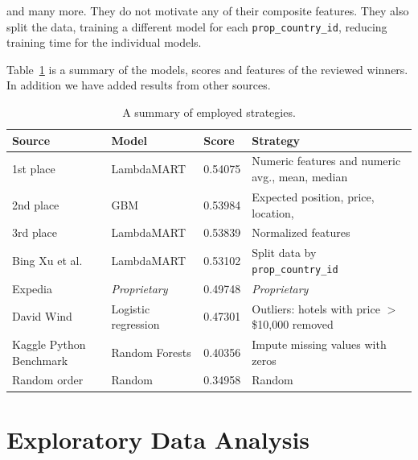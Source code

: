 \documentclass[runningheads,a4paper]{llncs}
\begin{document}
and many more. They do not motivate any of their composite features.
They also split the data, training a different model for each \verb|prop_country_id|, 
reducing training time for the individual models.

Table~\ref{table:winners} is a summary of the models, scores and features of the 
reviewed winners. In addition we have added results from other sources. \cite{kaggle:leaderboard}

\begin{table}
\centering
    \begin{tabular}{ llll }    
    \toprule
    Source                  & Model                 & Score   & Strategy                                        \\ \midrule
    1st place               & LambdaMART            & 0.54075 & Numeric features and numeric avg., mean, median \\
    2nd place               & GBM                   & 0.53984 & Expected position, price, location,             \\
    3rd place               & LambdaMART            & 0.53839 & Normalized features                             \\
    Bing Xu et al.          & LambdaMART            & 0.53102 & Split data by \verb|prop_country_id|            \\ 
    Expedia                 & \textit{Proprietary}  & 0.49748 & \textit{Proprietary}                            \\
    David Wind \cite{wind}  & Logistic regression   & 0.47301 & Outliers: hotels with price $>$ \$10,000 removed\\
    Kaggle Python Benchmark & Random Forests        & 0.40356 & Impute missing values with zeros                \\
    Random order            & Random                & 0.34958 & Random                                          \\ \bottomrule
    \end{tabular}
    \caption{A summary of employed strategies.}
	\label{table:winners}
\end{table}

\section{Exploratory Data Analysis}
\end{document}
